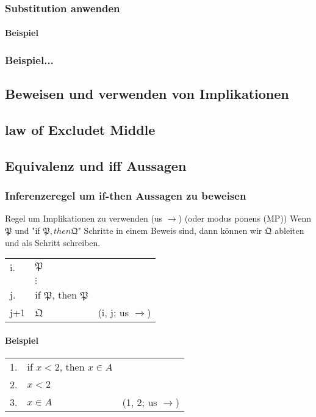         \subsubsection{Substitution anwenden}
            \paragraph{Beispiel}
        \subsubsection*{Beispiel...}
    \subsection{Beweisen und verwenden von Implikationen}
        \subsubsection{}
    \subsection{law of Excludet Middle}
    \subsection{Equivalenz und iff Aussagen}
        \subsubsection{Inferenzeregel um if-then Aussagen zu beweisen}
            {
                Regel um Implikationen zu verwenden (us \(\rightarrow\)) (oder modus ponens (MP))
            }
            {
                Wenn \(\mathfrak{P}\) und "if \(\mathfrak{P}, then \mathfrak{Q}\)" Schritte in einem Beweis sind, dann können wir \(\mathfrak{Q}\) ableiten und als Schritt schreiben.
            }
            \begin{tabular}{p{0.8cm}p{6cm}p{4cm}}
                i. & \(\mathfrak{P}\) & \\
                    & \(\vdots\) & \\
                j. & if \(\mathfrak{P}\), then \(\mathfrak{P}\) & \\
                j+1 & \(\mathfrak{Q}\) & (i, j; us \(\rightarrow\))\\
            \end{tabular}
            \paragraph{Beispiel\\}
                \begin{tabular}{p{0.8cm}p{6cm}p{4cm}}
                    1. & if \(x < 2\), then \(x \in A\) & \\
                    2. & \(x < 2\) & \\
                    3. & \(x \in A\) & (1, 2; us \(\rightarrow\))\\
                \end{tabular}

